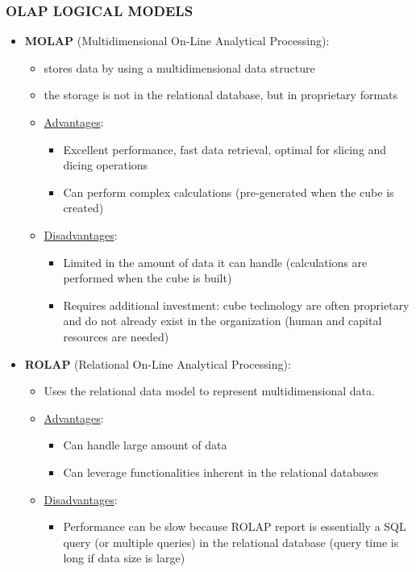 \documentclass[10pt,a4paper]{article}
\begin{document}
\subsubsection{OLAP LOGICAL MODELS}
\begin{itemize}
	\item \textbf{MOLAP} (Multidimensional On-Line Analytical Processing): 
	\begin{itemize}
		\item stores data by using a multidimensional data structure
		\item the storage is not in the relational database, but in proprietary formats
		\item \uline{Advantages}:
		\begin{itemize}
			\item Excellent performance, fast data retrieval, optimal for slicing and dicing operations
			\item Can perform complex calculations (pre-generated when the cube is created)
		\end{itemize}
		\item \uline{Disadvantages}:
		\begin{itemize}
			\item Limited in the amount of data it can handle (calculations are performed when the cube is built)
			\item Requires additional investment: cube technology are often proprietary and do not already exist in the organization (human and capital resources are needed)
		\end{itemize}
	\end{itemize}		
	\item \textbf{ROLAP} (Relational On-Line Analytical Processing):
	\begin{itemize}
		\item Uses the relational data model to represent multidimensional data.
		\item \uline{Advantages}:
		\begin{itemize}
			\item Can handle large amount of data
			\item Can leverage functionalities inherent in the relational databases
		\end{itemize}
		\item \uline{Disadvantages}:
		\begin{itemize}
			\item Performance can be slow because ROLAP report is essentially a SQL query (or multiple queries) in the relational database (query time is long if data size is large)

\end{itemize}
\end{itemize}
\end{itemize}
\end{document}
